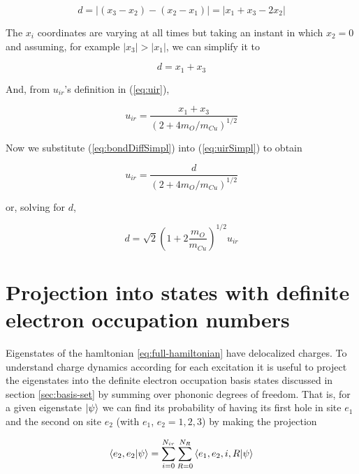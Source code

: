 \begin{equation}\label{eq:bondDiff}
d= \left| (x_3 - x_2) - (x_2 - x_1) \right| = \left| x_1 + x_3 - 2x_2 \right|
\end{equation}

The $x_i$ coordinates are varying at all times but taking an instant in which $x_2=0$ and assuming, for example $|x_3|>|x_1|$, we can simplify it to

\begin{equation}\label{eq:bondDiffSimpl}
d=x_1+x_3
\end{equation}

And, from $u_{ir}$'s definition in (\ref{eq:uir}),

\begin{equation}\label{eq:uirSimpl}
u_{ir}=\frac{x_1+x_3}{\left( 2+4 m_O/m_{Cu} \right)^{1/2}}
\end{equation}

Now we substitute (\ref{eq:bondDiffSimpl}) into (\ref{eq:uirSimpl}) to obtain

\begin{equation}\label{eq:uirvsd}
u_{ir}=\frac{d}{\left( 2+4 m_O/m_{Cu} \right)^{1/2}}
\end{equation}

or, solving for $d$,

\begin{equation}\label{eq:dvsuir}
d=\sqrt{2}\left(1 + 2\frac{m_O}{m_{Cu}} \right)^{1/2}u_{ir}
\end{equation}


\section{Projection into states with definite electron occupation numbers}

Eigenstates of the hamltonian \ref{eq:full-hamiltonian} have delocalized charges.
To understand charge dynamics according for each excitation it is useful to project the eigenstates into the definite electron occupation basis states discussed in section \ref{sec:basis-set} by summing over phononic degrees of freedom.
That is, for a given eigenstate $\left | \psi \right\rangle$ we can find its probability of having its first hole in site $e_1$ and the second on site $e_2$ (with $e_1$, $e_2=1,2,3$) by making the projection

\begin{equation}\label{eq:electron-occupation}
\left\langle e_2,e_2|\psi\right\rangle = \sum_{i=0}^{N_{ir}}\sum_{R=0}^{N_R} \left\langle e_1,e_2,i,R|\psi\right\rangle
\end{equation}


